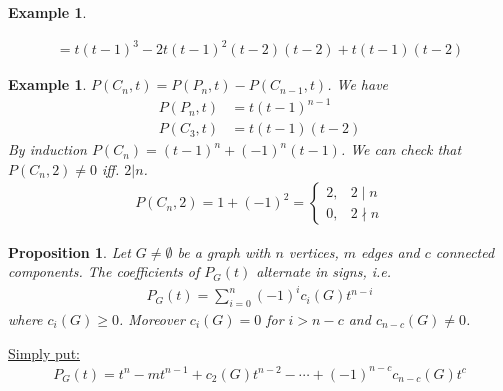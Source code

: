 \documentclass[a4paper]{article}
\theoremstyle{plain}
\newtheorem{proposition}[lemma]{Proposition}
\theoremstyle{myremark}
\newtheorem{example}[lemma]{Example}
\begin{document}
\begin{example}
\begin{center}
\end{center}
\begin{align*}
= t(t-1)^3-2t(t-1)^2(t-2)(t-2)+t(t-1)(t-2)
\end{align*}
\end{example}
\begin{example}
$P(C_n,t)=P(P_n,t)-P(C_{n-1},t)$. We have
\begin{align*}
P(P_n,t)&= t(t-1)^{n-1}\\
P(C_3,t)&=t(t-1)(t-2)
\end{align*}
By induction $P(C_n)=(t-1)^n+(-1)^n(t-1)$. We can check that $P(C_n,2)\neq 0$ iff. $2|n$.
\begin{align*}
P(C_n,2)=1+(-1)^2= \left\lbrace \begin{array}{ll}
2, & 2\mid n\\
0, & 2\nmid n
\end{array}\right.
\end{align*}
\end{example}
\begin{proposition}
Let $G\neq \emptyset$ be a graph with $n$ vertices, $m$ edges and $c$ connected components. The coefficients of $P_G(t)$ alternate in signs, i.e.
\begin{align*}
P_G(t)=\sum_{i=0}^n (-1)^i c_i(G)t^{n-i}
\end{align*}
where $c_i(G)\ge 0$. Moreover $c_i(G)=0$ for $i>n-c$ and $c_{n-c}(G)\neq 0$.
\end{proposition}
\underline{Simply put:}
\begin{align*}
P_G(t)=t^n-mt^{n-1}+c_2(G)t^{n-2}-\cdots + (-1)^{n-c}c_{n-c}(G)t^c
\end{align*}
\end{document}
